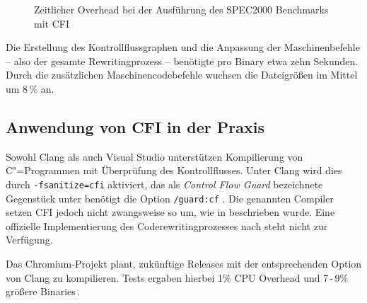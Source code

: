 \begin{figure}
	\centering
	\caption{Zeitlicher Overhead bei der Ausführung des SPEC2000 Benchmarks mit CFI}
	\label{img:time.overhead}
\end{figure}

Die Erstellung des Kontrollflussgraphen und die Anpassung der Maschinenbefehle -- also der gesamte Rewritingprozess -- benötigte pro Binary etwa zehn Sekunden. Durch die zusätzlichen Maschinencodebefehle wuchsen die Dateigrößen im Mittel um 8\,\% an.


\subsection{Anwendung von CFI in der Praxis}
Sowohl Clang als auch Visual Studio unterstützen Kompilierung von C"=Programmen mit Überprüfung des Kontrollflusses. Unter Clang wird dies durch \texttt{-fsanitize=cfi} aktiviert, das als \emph{Control Flow Guard} bezeichnete Gegenstück unter benötigt die Option \texttt{/guard:cf} \cite{ClangTeam.2015,Microsoft.2016}. Die genannten Compiler setzen CFI jedoch nicht zwangsweise so um, wie in \cite{Abadi.2009} beschrieben wurde. Eine offizielle Implementierung des Coderewritingprozesses nach \cite{Abadi.2009} steht nicht zur Verfügung.

Das Chromium-Projekt plant, zukünftige Releases mit der entsprechenden Option von Clang zu kompilieren. Tests ergaben hierbei 1\% CPU Overhead und 7\,-\,9\% größere Binaries\,\cite{ChromiumProjects.}.

